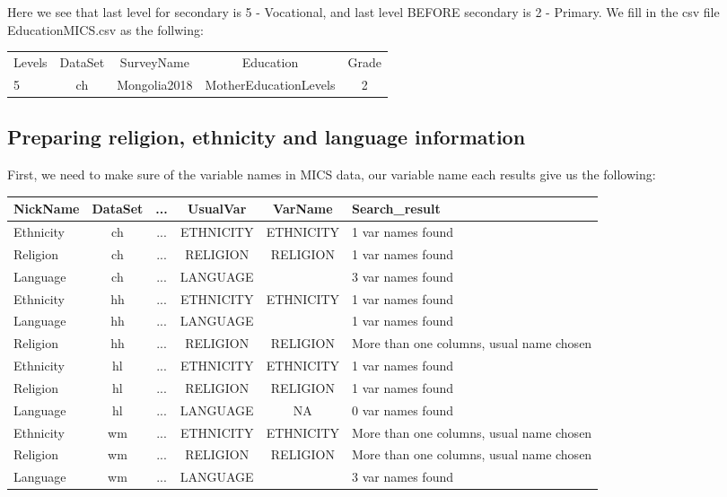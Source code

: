 \documentclass[12pt]{article}
\begin{document}
\begin{itemize}
	Here we see that last level for secondary is 5 - Vocational, and last level BEFORE secondary is 2 - Primary.
	We fill in the  csv file EducationMICS.csv as the follwing:
	
	\begin{tabular}{|l|c|c|c|c|}
		\hline
		Levels & DataSet & SurveyName & Education & Grade\\
		5 & ch & Mongolia2018 & MotherEducationLevels & 2 \\
		\hline
	\end{tabular}
	
	
\end{itemize} 
\subsection{Preparing religion, ethnicity and language information}

First, we need to make sure of the variable names in MICS data, our variable name each results give us the following:

	{\small
	\begin{tabular}{l|c|c|c|c|l|}
	\hline
	NickName & DataSet & ... & UsualVar & VarName & Search\_result\\
	\hline
	Ethnicity & ch & ... & ETHNICITY & ETHNICITY & 1 var names found\\
	Religion & ch & ...& RELIGION & RELIGION & 1 var names found\\
	Language & ch &... & LANGUAGE &  & 3 var names found\\
	Ethnicity & hh &... & ETHNICITY & ETHNICITY & 1 var names found\\
	Language & hh & ... & LANGUAGE &  & 1 var names found\\
	Religion & hh & ... & RELIGION & RELIGION & More than one columns, usual name chosen\\
	Ethnicity & hl& ... & ETHNICITY & ETHNICITY & 1 var names found\\
	Religion & hl & ... & RELIGION & RELIGION & 1 var names found\\
	Language & hl & ... & LANGUAGE & NA & 0 var names found\\
	Ethnicity & wm &... & ETHNICITY & ETHNICITY & More than one columns, usual name chosen\\
	Religion & wm & ... & RELIGION & RELIGION & More than one columns, usual name chosen\\
	Language & wm & ... & LANGUAGE &  & 3 var names found\\
	\hline
\end{tabular}
}
\end{document}
